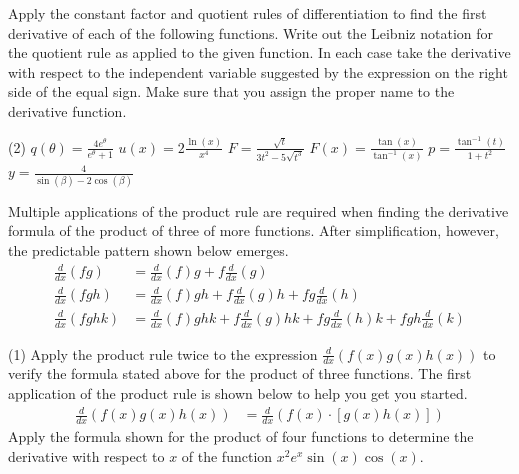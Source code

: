 \documentclass[12pt,]{book}
\theoremstyle{plain}
\theoremstyle{definition}
\numberwithin{equation}{section}
\newcommand{\fe}[2]{#1\mathopen{}\left(#2\right)\mathclose{}}
\newcommand{\lzoo}[2]{{\frac{d}{d#1}}{\left(#2\right)}}
\begin{document}
\par\smallskip\noindent
Apply the constant factor and quotient rules of differentiation to find the first derivative of each of the following functions.   Write out the Leibniz notation for the quotient rule as applied to the given function. In each case take the derivative with respect to the independent variable suggested by the expression on the right side of the equal sign.  Make sure that you assign the proper name to the derivative function.%
\par
\begin{exercisegroup}(2)
\exercise[13.]\hypertarget{exercise-413}{\null}\(\fe{q}{\theta}=\frac{4e^{\theta}}{e^\theta+1}\)%
\exercise[14.]\hypertarget{exercise-414}{\null}\(\fe{u}{x}=2\frac{\fe{\ln}{x}}{x^4}\)%
\exercise[15.]\hypertarget{exercise-415}{\null}\(F=\frac{\sqrt{t}}{3t^2-5\sqrt{t^3}}\)%
\exercise[16.]\hypertarget{exercise-416}{\null}\(\fe{F}{x}=\frac{\fe{\tan}{x}}{\fe{\tan^{-1}}{x}}\)%
\exercise[17.]\hypertarget{exercise-417}{\null}\(p=\frac{\fe{\tan^{-1}}{t}}{1+t^2}\)%
\exercise[18.]\hypertarget{exercise-418}{\null}\(y=\frac{4}{\fe{\sin}{\beta}-2\fe{\cos}{\beta}}\)%
\end{exercisegroup}
\par\smallskip\noindent
Multiple applications of the product rule are required when finding the derivative formula of the product of three of more functions.  After simplification, however, the predictable pattern shown below emerges.\begin{align*}
\lzoo{x}{fg}&=\lzoo{x}{f}g+f\lzoo{x}{g}\\
\lzoo{x}{fgh}&=\lzoo{x}{f}gh+f\lzoo{x}{g}h+fg\lzoo{x}{h}\\
\lzoo{x}{fghk}&=\lzoo{x}{f}ghk+f\lzoo{x}{g}hk+fg\lzoo{x}{h}k+fgh\lzoo{x}{k}
\end{align*}%
\par
\begin{exercisegroup}(1)
\exercise[19.]\hypertarget{exercise-419}{\null}Apply the product rule twice to the expression \(\lzoo{x}{\fe{f}{x}\fe{g}{x}\fe{h}{x}}\)  to verify the 
formula stated above for the product of three functions.  The first application of the product rule is shown below to help you get you started.\begin{align*}
\lzoo{x}{\fe{f}{x}\fe{g}{x}\fe{h}{x}}&=\lzoo{x}{\fe{f}{x}\cdot\left[\fe{g}{x}\fe{h}{x}\right]}
\end{align*}%
\exercise[20.]\hypertarget{exercise-420}{\null}Apply the formula shown for the product of four functions to determine the derivative with respect to \(x\) of the function \(x^2e^x\fe{\sin}{x}\fe{\cos}{x}\).%
\end{exercisegroup}
\end{document}
